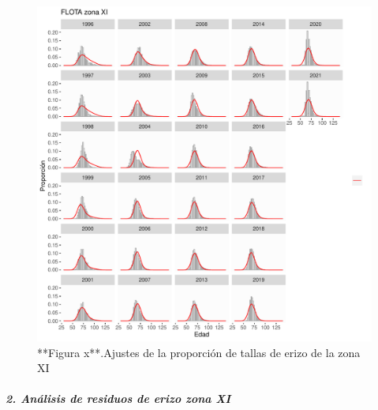 \documentclass[
]{article}
\begin{document}
\begin{figure}

{\centering \includegraphics{Figuras/ajustesCompFXI-1} 

}

\caption{**Figura x**.Ajustes de la proporción de tallas de erizo de la zona XI}\label{fig:ajustesCompFXI}
\end{figure}

\hypertarget{anuxe1lisis-de-residuos-de-erizo-zona-xi}{%
\subparagraph{\texorpdfstring{\textbf{\emph{2. Análisis de residuos de
erizo zona
XI}}}{2. Análisis de residuos de erizo zona XI}}\label{anuxe1lisis-de-residuos-de-erizo-zona-xi}}
\end{document}

